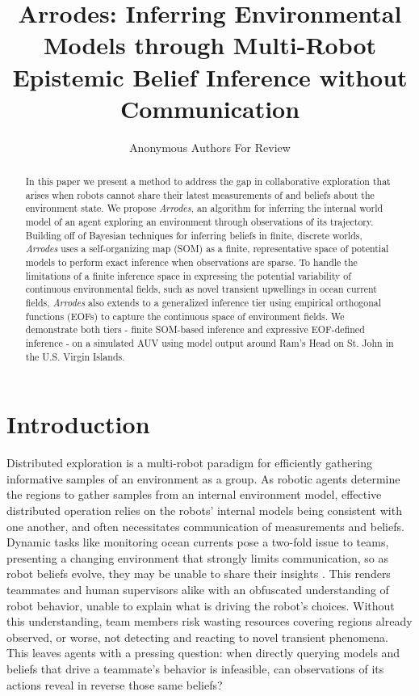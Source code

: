 \documentclass[letterpaper,10pt,conference]{ieeeconf}
\title{\LARGE \bf
Arrodes: Inferring Environmental Models through Multi-Robot Epistemic Belief Inference without Communication
}
\author{Anonymous Authors For Review}
\begin{document}
\maketitle

\begin{abstract}

  In this paper we present a method to address the gap in collaborative exploration that arises when robots cannot share their latest measurements of and beliefs about the environment state. We propose \textit{Arrodes}, an algorithm for inferring the internal world model of an agent exploring an environment through observations of its trajectory. Building off of Bayesian techniques for inferring beliefs in finite, discrete worlds, \textit{Arrodes} uses a self-organizing map (SOM) as a finite, representative space of potential models to perform exact inference when observations are sparse. To handle the limitations of a finite inference space in expressing the potential variability of continuous environmental fields, such as novel transient upwellings in ocean current fields, \textit{Arrodes} also extends to a generalized inference tier using empirical orthogonal functions (EOFs) to capture the continuous space of environment fields. We demonstrate both tiers - finite SOM-based inference and expressive EOF-defined inference - on a simulated AUV using model output around Ram's Head on St. John in the U.S. Virgin Islands.

\end{abstract}

\section{Introduction}

Distributed exploration is a multi-robot paradigm for efficiently gathering informative samples of an environment as a group. As robotic agents determine the regions to gather samples from an internal environment model, effective distributed operation relies on the robots' internal models being consistent with one another, and often necessitates communication of measurements and beliefs. Dynamic tasks like monitoring ocean currents pose a two-fold issue to teams, presenting a changing environment that strongly limits communication, so as robot beliefs evolve, they may be unable to share their insights \cite{hollinger2012underwater, binney2010informative}. This renders teammates and human supervisors alike with an obfuscated understanding of robot behavior, unable to explain what is driving the robot's choices. Without this understanding, team members risk wasting resources covering regions already observed, or worse, not detecting and reacting to novel transient phenomena. This leaves agents with a pressing question: when directly querying models and beliefs that drive a teammate's behavior is infeasible, can observations of its actions reveal in reverse those same beliefs?
\end{document}

